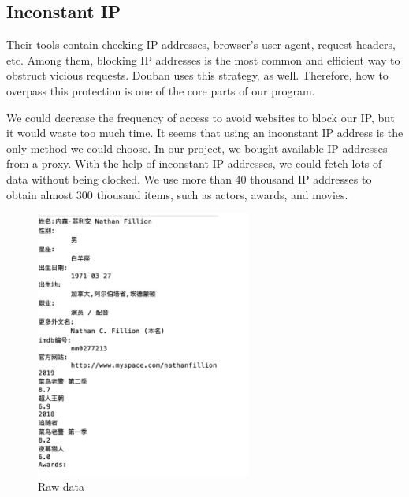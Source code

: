 \documentclass[a4paper]{article}
\begin{document}
  \subsection{Inconstant IP}
  Their tools contain checking IP addresses, browser's user-agent, request headers, etc. Among them, blocking IP addresses is the most common and efficient way to obstruct vicious requests. Douban uses this strategy, as well. Therefore, how to overpass this protection is one of the core parts of our program. \par
  We could decrease the frequency of access to avoid websites to block our IP, but it would waste too much time. It seems that using an inconstant IP address is the only method we could choose. In our project, we bought available IP addresses from a proxy. With the help of inconstant IP addresses, we could fetch lots of data without being clocked. We use more than 40 thousand IP addresses to obtain almost 300 thousand items, such as actors, awards, and movies.


  \begin{figure}[H]
    \centering
    \includegraphics[width=200pt]{figures/raw_data.png}
    \caption{Raw data}
    \label{fig:raw}
  \end{figure}
\end{document}
